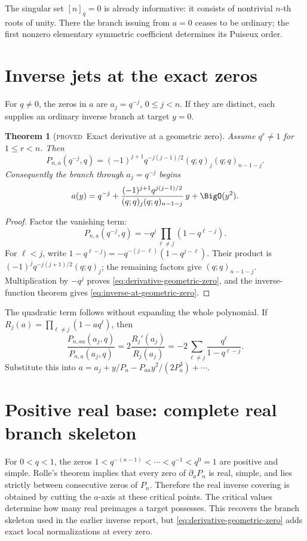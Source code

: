 \documentclass[11pt,letterpaper,oneside,openany]{book}
\newtheorem{theorem}{Theorem}[chapter]
\theoremstyle{definition}
\theoremstyle{remark}
\newcommand{\statusproved}{\textcolor{provedgreen}{\textsc{proved}}}
\begin{document}
The singular set \([n]_q=0\) is already informative: it consists of nontrivial
\(n\)-th roots of unity.  There the branch issuing from \(a=0\) ceases to be
ordinary; the first nonzero elementary symmetric coefficient determines its
Puiseux order.

\section{Inverse jets at the exact zeros}
For \(q\ne0\), the zeros in \(a\) are \(a_j=q^{-j}\),
\(0\le j<n\).  If they are distinct, each supplies an ordinary inverse branch
at target \(y=0\).

\begin{theorem}[\statusproved\ Exact derivative at a geometric zero]
Assume \(q^r\ne1\) for \(1\le r<n\).  Then
\begin{equation}
 P_{n,a}(q^{-j},q)=
 (-1)^{j+1}q^{-j(j-1)/2}(q;q)_j(q;q)_{n-1-j}.
 \label{eq:derivative-geometric-zero}
\end{equation}
Consequently the branch through \(a_j=q^{-j}\) begins
\begin{equation}
 a(y)=q^{-j}+
 \frac{(-1)^{j+1}q^{j(j-1)/2}}
 {(q;q)_j(q;q)_{n-1-j}}\,y+\BigO(y^2).
 \label{eq:inverse-at-geometric-zero}
\end{equation}
\end{theorem}
\begin{proof}
Factor the vanishing term:
\[
 P_{n,a}(q^{-j},q)=-q^j\prod_{\ell\ne j}(1-q^{\ell-j}).
\]
For \(\ell<j\), write
\(1-q^{\ell-j})=-q^{-(j-\ell)}(1-q^{j-\ell})\).  Their product is
\((-1)^jq^{-j(j+1)/2}(q;q)_j\); the remaining factors give
\((q;q)_{n-1-j}\).  Multiplication by \(-q^j\) proves
\cref{eq:derivative-geometric-zero}, and the inverse-function theorem gives
\cref{eq:inverse-at-geometric-zero}.
\end{proof}

The quadratic term follows without expanding the whole polynomial.  If
\(R_j(a)=\prod_{\ell\ne j}(1-aq^\ell)\), then
\[
 \frac{P_{n,aa}(a_j,q)}{P_{n,a}(a_j,q)}
 =2\frac{R_j'(a_j)}{R_j(a_j)}
 =-2\sum_{\ell\ne j}\frac{q^\ell}{1-q^{\ell-j}}.
\]
Substitute this into \(a=a_j+y/P_a-P_{aa}y^2/(2P_a^3)+\cdots\).

\section{Positive real base: complete real branch skeleton}
For \(0<q<1\), the zeros
\(1<q^{-(n-1)}<\cdots<q^{-1}<q^0=1\) are positive and simple.  Rolle's
theorem implies that every zero of \(\partial_aP_n\) is real, simple, and lies
strictly between consecutive zeros of \(P_n\).  Therefore the real inverse
covering is obtained by cutting the \(a\)-axis at these critical points.  The
critical values determine how many real preimages a target possesses.  This
recovers the branch skeleton used in the earlier inverse report, but
\cref{eq:derivative-geometric-zero} adds exact local normalizations at every
zero.
\end{document}
